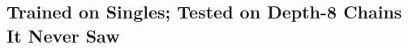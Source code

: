 \subsection{Trained on Singles; Tested on Depth-8 Chains It Never Saw}
\label{sec:depth8_composition}

